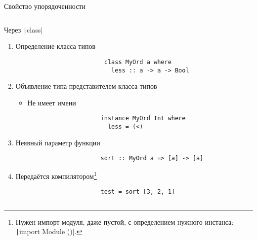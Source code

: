 \begin{frame}[fragile]{Свойство упорядоченности}
\begin{columns}[onlytextwidth]
\begin{column}[t]{0.485\textwidth}
\begin{block}{Через \texttt|class|}
\begin{enumerate}
                        \item Определение класса типов
                        \begin{verbatim}
                         class MyOrd a where
                           less :: a -> a -> Bool
                        \end{verbatim}
                        \item Объявление типа представителем класса типов
                        \begin{itemize}
                            \item Не имеет имени
                        \end{itemize}
                        \begin{verbatim}
                        instance MyOrd Int where
                          less = (<)
                        \end{verbatim}
                        \item Неявный параметр функции
                        \begin{verbatim}
                        sort :: MyOrd a => [a] -> [a]
                        \end{verbatim}
                        \item Передаётся компилятором\footnote{Нужен импорт модуля, даже пустой, с определением нужного инстанса: \texttt|import Module ()|.}
                        \begin{verbatim}
                        test = sort [3, 2, 1]
                        \end{verbatim}
                    \end{enumerate}
                \end{block}
            \end{column}
        \end{columns}
    \end{frame}

